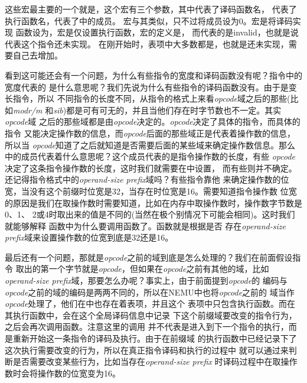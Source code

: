 这些宏最主要的一个就是，这个宏有三个参数，其中代表了译码函数名，
代表了执行函数名，代表了中的成员。
宏与其类似，只不过将成员设为0。宏是将译码实现
函数设为，宏是仅设置执行函数，宏的定义是，
而代表的是invalid，也就是说代表这个指令还未实现。
在刚开始时，表项中大多数都是，也就是还未实现，需要自己去增加。

看到这可能还会有一个问题，为什么有些指令的宽度和译码函数没有呢？指令中的宽度代表的
是什么意思呢？我们先说为什么有些指令的译码函数没有。由于\arch 是变长指令，所以
不同指令的长度不同，从指令的格式上来看\emph{opcode}域之后的那些(比如\emph{modr/m}
和\emph{sib})都是可有可无的，并且当他们存在时字节数也不一定。其实\emph{opcode}域
之后的那些域都是由\emph{opcode}决定的。\emph{opcode}决定了具体的指令，而具体的指令
又能决定操作数的信息，而\emph{opcode}后面的那些域正是代表着操作数的信息，所以当
\emph{opcode}知道了之后就知道是否需要后面的某些域来确定操作数信息。那么
中的成员代表着什么意思呢？这个成员代表的是指令操作数的长度，有些
\emph{opcode}决定了这条指令操作数的长度，这时我们就需要在中设置，
而有些则并不确定。还记得指令格式中的\emph{operand-size prefix}域吗？有些指令靠他
来确定操作数的位宽，当没有这个前缀时位宽是32，当存在时位宽是16。需要知道指令操作数
位宽的原因是我们在取操作数时需要知道，比如在内存中取操作数时，操作数字节数是0、1、
2或4时取出来的值是不同的(当然在极个别情况下可能会相同)。这时我们就能够解释
函数中为什么要调用函数了。函数就是根据是否
存在\emph{operand-size prefix}域来设置操作数的位宽到底是32还是16。

最后还有一个问题，那就是\emph{opcode}之前的域到底是怎么处理的？我们在前面假设指令
取出的第一个字节就是\emph{opcode}，但如果在\emph{opcode}之前有其他的域，比如
\emph{operand-size prefix}域，那要怎么办呢？事实上，由于前面提到\emph{opcode}的
编码与\emph{opcode}之前的域的编码是两两不同的，所以在NEMU中也将\emph{opcode}之前的
域当作\emph{opcode}处理了，他们在中也存在着表项，并且这个
表项中只包含执行函数。而在其执行函数中，会在这个全局译码信息中记录
下这个前缀域要改变的指令行为，之后会再次调用函数。注意这里的调用
并不代表是进入到下一个指令的执行，而是重新开始这一条指令的译码及执行。由于在前缀域
的执行函数中已经记录下了这次执行需要改变的行为，所以在真正指令译码和执行的过程中
就可以通过来判断是否需要改变某些行为，比如当存在\emph{operand-size prefix}
时译码过程中在取操作数时会将操作数的位宽变为16。

